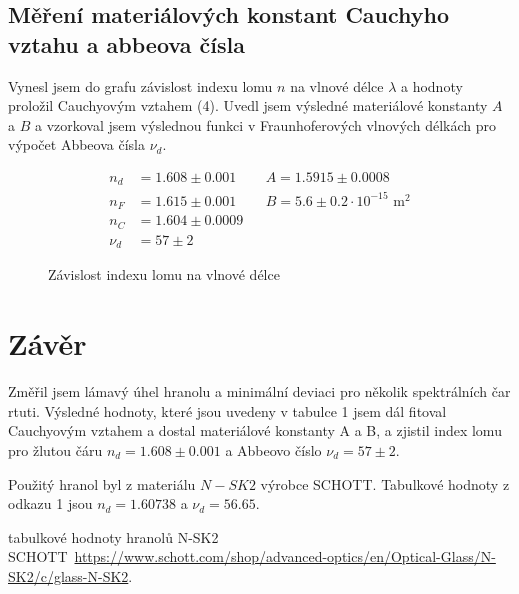\documentclass[a4paper,11pt]{article}
\begin{document}
\subsection{Měření materiálových konstant Cauchyho vztahu a abbeova čísla}

Vynesl jsem do grafu závislost indexu lomu $ n $ na vlnové délce $ \lambda $ a hodnoty proložil Cauchyovým vztahem (4). Uvedl jsem výsledné materiálové konstanty $ A $ a $ B $ a vzorkoval jsem výslednou funkci v Fraunhoferových vlnových délkách pro výpočet Abbeova čísla $ \nu_d $.

\begin{align*}
    n_d &= 1.608 \pm 0.001 && A = 1.5915 \pm 0.0008  \\
    n_F &= 1.615 \pm 0.001 && B = 5.6 \pm 0.2 \cdot 10^{-15} \text{ m}^2 \\
    n_C &= 1.604 \pm 0.0009 \\
    \nu_d &= 57 \pm 2
\end{align*}

\begin{figure}[htpb]
    \centering
    
    \captionsetup{type=graph}
    \caption{Závislost indexu lomu na vlnové délce}
\end{figure}

\section{Závěr}

Změřil jsem lámavý úhel hranolu a minimální deviaci pro několik spektrálních čar rtuti. Výsledné hodnoty, které jsou uvedeny v tabulce 1 jsem dál fitoval Cauchyovým vztahem a dostal materiálové konstanty A a B, a zjistil index lomu pro žlutou čáru $ n_d = 1.608 \pm 0.001 $ a Abbeovo číslo $ \nu_d = 57 \pm 2 $. 

Použitý hranol byl z materiálu $ N-SK2 $ výrobce SCHOTT. Tabulkové hodnoty z odkazu 1 jsou $ n_d = 1.60738 $ a $ \nu_d = 56.65 $.

\begin{thebibliography}{0}
 tabulkové hodnoty hranolů N-SK2 SCHOTT~\url{https://www.schott.com/shop/advanced-optics/en/Optical-Glass/N-SK2/c/glass-N-SK2}.   
\end{thebibliography}
\end{document}
